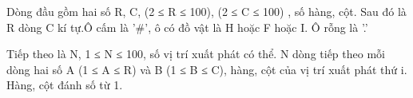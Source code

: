 Dòng đầu gồm hai số R, C, (2 ≤ R ≤ 100), (2 ≤ C ≤ 100) , số hàng, cột. Sau đó là R dòng C kí tự.Ô cấm là '\#', ô có đồ vật là H hoặc F hoặc I.  Ô rỗng là '.'  

   Tiếp theo là N, 1 ≤ N ≤ 100, số vị trí xuất phát có thể. N dòng tiếp theo mỗi dòng hai số A (1 ≤ A ≤ R) và B (1 ≤ B ≤ C),  hàng, cột của vị trí xuất phát thứ i.  Hàng, cột đánh số từ 1.  

\